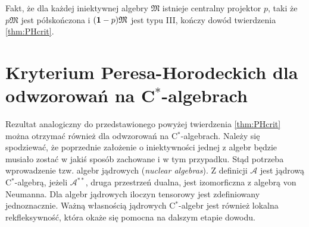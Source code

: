 Fakt, że dla każdej iniektywnej algebry $\mathfrak{M}$
istnieje centralny projektor $p$, taki że $p\mathfrak{M}$
jest półskończona i $({\bf 1}-p)\mathfrak{M}$ jest typu III,
kończy dowód twierdzenia \ref{thm:PHcrit}.


\section{Kryterium Peresa-Horodeckich dla odwzorowań na C$^*$-algebrach}
\label{sec:HorCstar}
Rezultat analogiczny do przedstawionego powyżej twierdzenia \ref{thm:PHcrit}
można otrzymać również dla odwzorowań na C$^*$-algebrach.
Należy się spodziewać, że poprzednie założenie o iniektywności jednej z
algebr będzie musiało zostać w jakiś sposób zachowane i w tym przypadku.
Stąd potrzeba wprowadzenie tzw. algebr jądrowych (\emph{nuclear algebras}).
Z definicji $\mathcal{A}$ jest jądrową C$^{*}$-algebrą,
jeżeli $\mathcal{A}^{**}$, druga przestrzeń dualna,
jest izomorficzna z algebrą von Neumanna.
Dla algebr jądrowych iloczyn tensorowy jest zdefiniowany jednoznacznie.
Ważną własnością jądrowych C$^{*}$-algebr jest również lokalna rekfleksywność,
która okaże się pomocna na dalszym etapie dowodu.

